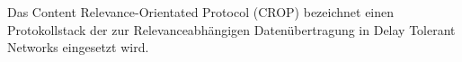 Das Content Relevance-Orientated Protocol (CROP) bezeichnet einen Protokollstack
der zur Relevanceabh{\"a}ngigen Daten{\"u}bertragung in Delay Tolerant Networks
eingesetzt wird.

